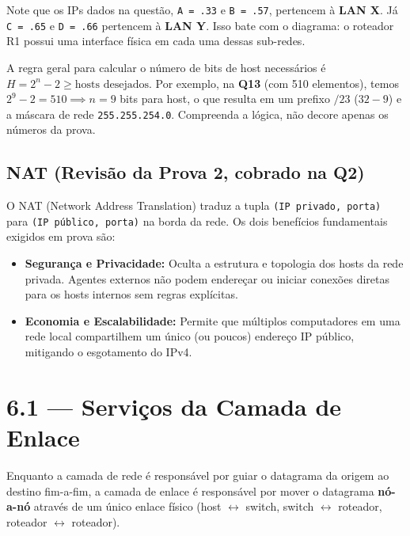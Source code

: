 \documentclass[11pt,a4paper]{article}
\begin{document}
Note que os IPs dados na questão, \texttt{A = .33} e \texttt{B = .57}, pertencem à \textbf{LAN X}. Já \texttt{C = .65} e \texttt{D = .66} pertencem à \textbf{LAN Y}. Isso bate com o diagrama: o roteador R1 possui uma interface física em cada uma dessas sub-redes.

\begin{reflexao}
A regra geral para calcular o número de bits de host necessários é $H = 2^n - 2 \ge \text{hosts desejados}$. Por exemplo, na \textbf{Q13} (com 510 elementos), temos $2^9 - 2 = 510 \implies n = 9$ bits para host, o que resulta em um prefixo $/23$ ($32 - 9$) e a máscara de rede \texttt{255.255.254.0}. Compreenda a lógica, não decore apenas os números da prova.
\end{reflexao}

\subsection*{NAT (Revisão da Prova 2, cobrado na Q2)}

O NAT (Network Address Translation) traduz a tupla \texttt{(IP privado, porta)} para \texttt{(IP público, porta)} na borda da rede. Os dois benefícios fundamentais exigidos em prova são:
\begin{itemize}
    \item \textbf{Segurança e Privacidade:} Oculta a estrutura e topologia dos hosts da rede privada. Agentes externos não podem endereçar ou iniciar conexões diretas para os hosts internos sem regras explícitas.
    \item \textbf{Economia e Escalabilidade:} Permite que múltiplos computadores em uma rede local compartilhem um único (ou poucos) endereço IP público, mitigando o esgotamento do IPv4.
\end{itemize}

\hrulefill

\section{6.1 --- Serviços da Camada de Enlace}

Enquanto a camada de rede é responsável por guiar o datagrama da origem ao destino fim-a-fim, a camada de enlace é responsável por mover o datagrama \textbf{nó-a-nó} através de um único enlace físico (host $\leftrightarrow$ switch, switch $\leftrightarrow$ roteador, roteador $\leftrightarrow$ roteador). 
\end{document}
